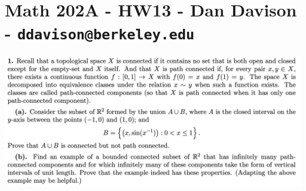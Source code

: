 \section{Math 202A - HW13 - Dan Davison - \texttt{ddavison@berkeley.edu}}

\begin{mdframed}
\includegraphics[width=400pt]{img/analysis--berkeley-202a-hw13-26dd.png}
\end{mdframed}

